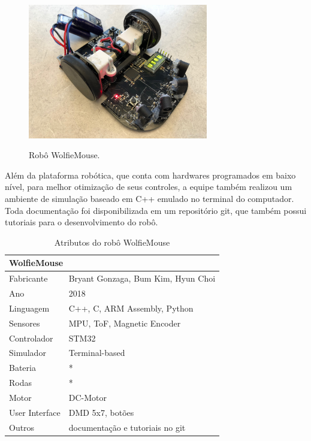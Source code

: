 \begin{figure}[H]
	\centering
	\caption{Robô WolfieMouse.}
	\includegraphics[width=0.7\textwidth]
	{Figures/WolfieMouse_model.jpg}
	\label{fig:WolfieMouse_model}
\end{figure}

Além da plataforma robótica, que conta com hardwares programados em baixo nível, para melhor otimização de seus controles, a equipe também realizou um ambiente de simulação baseado em C++ emulado no terminal do computador. Toda documentação foi disponibilizada em um repositório git, que também possui tutoriais para o desenvolvimento do robô.

\begin{table}[H]
	\centering
	\caption{Atributos do robô WolfieMouse}
	\begin{tabular}{|l|l|}
		\hline
		\multicolumn{2}{|l|}{\textbf{WolfieMouse}} \\ \hline
		Fabricante & Bryant Gonzaga, Bum Kim, Hyun Choi \\ \hline
		Ano & 2018 \\ \hline
		Linguagem & C++, C, ARM Assembly, Python \\ \hline
		Sensores & MPU, ToF, Magnetic Encoder \\ \hline
		Controlador & STM32 \\ \hline
		Simulador & Terminal-based \\ \hline
		Bateria & * \\ \hline
		Rodas & * \\ \hline
		Motor & DC-Motor \\ \hline
		User Interface & DMD 5x7, botões \\ \hline
		Outros & documentação e tutoriais no git \\ \hline
	\end{tabular}
	\label{tab:WolfieMouse}
\end{table}

